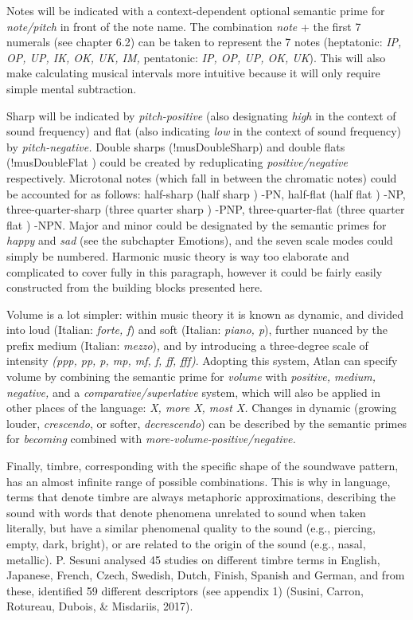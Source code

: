 Notes will be indicated with a context-dependent optional semantic prime for \textit{note/pitch} in front of the note name. The combination {\it note} + the first 7 numerals (see chapter 6.2) can be taken to represent the 7 notes (heptatonic: \textit{IP, OP, UP, IK, OK, UK, IM,} pentatonic: \textit{IP, OP, UP, OK, UK}). This will also make calculating musical intervals more intuitive because it will only require simple mental subtraction. 

Sharp will be indicated by \textit{pitch-positive} (also designating \textit{high} in the context of sound frequency) and flat (also indicating \textit{low} in the context of sound frequency) by \textit{pitch-negative.} Double sharps (!musDoubleSharp) and double flats (!musDoubleFlat ) could be created by reduplicating \textit{positive/negative} respectively. Microtonal notes (which fall in between the chromatic notes) could be accounted for as follows: half-sharp (half sharp ) -PN, half-flat (half flat ) -NP, three-quarter-sharp (three quarter sharp ) -PNP, three-quarter-flat (three quarter flat ) -NPN. Major and minor could be designated by the semantic primes for \textit{happy} and \textit{sad} (see the subchapter Emotions), and the seven scale modes could simply be numbered. Harmonic music theory is way too elaborate and complicated to cover fully in this paragraph, however it could be fairly easily constructed from the building blocks presented here. 

Volume is a lot simpler: within music theory it is known as dynamic, and divided into loud (Italian: \textit{forte, f}) and soft (Italian: \textit{piano, p}), further nuanced by the prefix medium (Italian: \textit{mezzo}), and by introducing a three-degree scale of intensity \textit{(ppp, pp, p, mp, mf, f, ff, fff)}. Adopting this system, Atlan can specify volume by combining the semantic prime for \textit{volume} with \textit{positive, medium, negative,} and a \textit{comparative/superlative} system, which will also be applied in other places of the language: \textit{X, more X, most X.} Changes in dynamic (growing louder, \textit{crescendo}, or softer, \textit{decrescendo}) can be described by the semantic primes for \textit{becoming} combined with \textit{more-volume-positive/negative.} 

Finally, timbre, corresponding with the specific shape of the soundwave pattern, has an almost infinite range of possible combinations. This is why in language, terms that denote timbre are always metaphoric approximations, describing the sound with words that denote phenomena unrelated to sound when taken literally, but have a similar phenomenal quality to the sound (e.g., piercing, empty, dark, bright), or are related to the origin of the sound (e.g., nasal, metallic). P. Sesuni analysed 45 studies on different timbre terms in English, Japanese, French, Czech, Swedish, Dutch, Finish, Spanish and German, and from these, identified 59 different descriptors (see appendix 1) (Susini, Carron, Rotureau, Dubois, \& Misdariis, 2017). 

